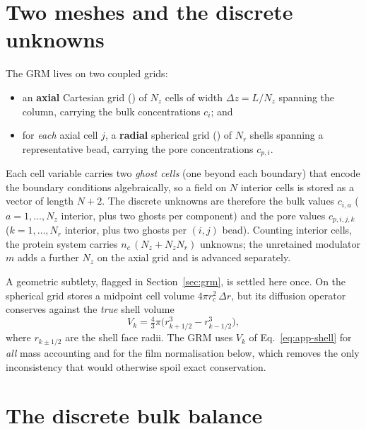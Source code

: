 \section{Two meshes and the discrete unknowns}
\label{app:grm-mesh}

The GRM lives on two coupled grids:

\begin{itemize}
  \item an \textbf{axial} Cartesian grid () of $N_z$ cells of width
  $\Delta z = L/N_z$ spanning the column, carrying the bulk concentrations
  $c_i$; and
  \item for \emph{each} axial cell $j$, a \textbf{radial} spherical grid
  () of $N_r$ shells spanning a representative bead,
  carrying the pore concentrations $c_{p,i}$.
\end{itemize}

Each  cell variable carries two \emph{ghost cells} (one beyond each
boundary) that encode the boundary conditions algebraically, so a field on $N$
interior cells is stored as a vector of length $N+2$. The discrete unknowns are
therefore the bulk values $c_{i,a}$ ($a=1,\dots,N_z$ interior, plus two ghosts per
component) and the pore values $c_{p,i,j,k}$ ($k=1,\dots,N_r$ interior, plus two
ghosts per $(i,j)$ bead). Counting interior cells, the protein system carries
$n_c\,(N_z + N_z N_r)$ unknowns; the unretained modulator $m$ adds a further $N_z$
on the axial grid and is advanced separately.

A geometric subtlety, flagged in Section~\ref{sec:grm}, is settled here once. On
the spherical grid  stores a midpoint cell volume
$4\pi r_c^2\,\Delta r$, but its diffusion operator conserves against the
\emph{true} shell volume
%
\begin{equation}
V_k = \tfrac{4}{3}\pi\bigl(r_{k+1/2}^3 - r_{k-1/2}^3\bigr),
\label{eq:app-shell}
\end{equation}
%
where $r_{k\pm1/2}$ are the shell face radii. The GRM uses $V_k$ of
Eq.~\eqref{eq:app-shell} for \emph{all} mass accounting and for the film
normalisation below, which removes the only inconsistency that would otherwise
spoil exact conservation.

\section{The discrete bulk balance}
\label{app:grm-bulk}

